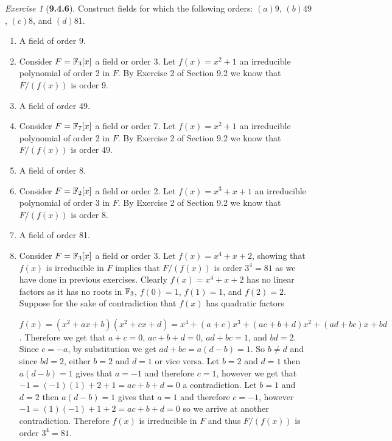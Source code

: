 \documentclass[12pt]{amsart}
\makeatletter
\theoremstyle{remark}
\newtheorem*{exercise}{Exercise}%
\def\FF{{\ensuremath\mathbb F}}
\renewenvironment{proof}[1][\proofname]{\par\doublespacing
  \pushQED{\qed}%
  \normalfont \topsep6\p@\@plus6\p@\relax
  \list{}{%
    \settowidth{\leftmargin}{\itshape\proofname:\hskip\labelsep}%
    \setlength{\labelwidth}{0pt}%
    \setlength{\itemindent}{-\leftmargin}%
  }%
  \item[\hskip\labelsep\itshape#1\@addpunct{:}]\ignorespaces
}{%
  \popQED\endlist\@endpefalse
  \singlespacing
}
\theoremstyle{mycomment}
\makeatother
\begin{document}
  \begin{exercise}[\textbf{9.4.6}] Construct fields for which the following orders: $(a)9$, $(b)49$, $(c)8$, and $(d)81$.
          \begin{enumerate}
            \item[(a)] A field of order 9.
            \begin{proof}
              Consider $F = \FF_3[x]$ a field or order 3. Let $f(x) = x^2 + 1$ an irreducible polynomial of order 2 in $F$. By Exercise 2 of Section 9.2 we know that $F/(f(x))$ is order 9.
            \end{proof}
            \vspace{.15in}

            \item[(b)] A field of order 49.
            \begin{proof}
              Consider $F = \FF_7[x]$ a field or order 7. Let $f(x) = x^2 + 1$ an irreducible polynomial of order 2 in $F$. By Exercise 2 of Section 9.2 we know that $F/(f(x))$ is order 49.
            \end{proof}
            \vspace{.15in}

            \item[(c)] A field of order 8.
            \begin{proof}
              Consider $F = \FF_2[x]$ a field or order 2. Let $f(x) = x^3 + x + 1$ an irreducible polynomial of order 3 in $F$. By Exercise 2 of Section 9.2 we know that $F/(f(x))$ is order 8.
            \end{proof}
            \vspace{.15in}


            \item[(d)] A field of order 81.
            \begin{proof}
              Consider $F = \FF_3[x]$ a field or order 3. Let $f(x) = x^4 + x + 2$, showing that $f(x)$ is irreducible in $F$
              implies that $F/(f(x))$ is order $3^4 = 81$ as we have done in previous exercises. Clearly  $f(x) = x^4 + x + 2$ has no linear factors as it has no roots in $\FF_3$, $f(0) = 1$, $f(1) = 1$, and $f(2) = 2$. Suppose for the sake of contradiction that  $f(x)$ has quadratic factors

              $f(x) = (x^2 + ax + b)(x^2 + cx + d) = x^4 + (a + c)x^3 + (ac + b + d)x^2 + (ad + bc)x + bd$. Therefore we get that $a + c = 0$, $ac + b + d = 0$, $ad + bc = 1$, and $bd = 2$. Since $c = -a$, by substitution we get $ad + bc = a(d - b) = 1$. So $b \neq d$ and since $bd = 2$, either $b = 2$ and $d = 1$ or vice versa.
              Let $b = 2$ and $d = 1$ then $a(d - b) = 1$ gives that $a = -1$ and therefore $c = 1$, however we get that 
              $-1 = (-1)(1) + 2 + 1 = ac + b + d = 0$ a contradiction. Let $b = 1$ and $d = 2$ then $a(d - b) = 1$ gives that $a = 1$ and therefore $c = -1$, however $-1 = (1)(-1) + 1 + 2 = ac + b + d = 0$ so we arrive at another contradiction. Therefore $f(x)$ is irreducible in $F$ and thus $F/(f(x))$ is order $3^4 = 81$.
            \end{proof}
          \end{enumerate}

    \end{exercise}
\end{document}
